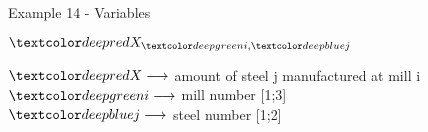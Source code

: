 \begin{frame}{Example 14 - Variables}
\begin{center}
\Huge{
$\colora{X}_{\colorb{i}, \colorc{j}}$
}
\end{center}
\Large{
$\colora{X} \longrightarrow$
    amount of steel j manufactured at mill i \\ \vspace{1cm}
$\colorb{i} \longrightarrow$
    mill number [1;3] \\ \vspace{1cm}
$\colorc{j} \longrightarrow$
    steel number [1;2]
}
\end{frame}
